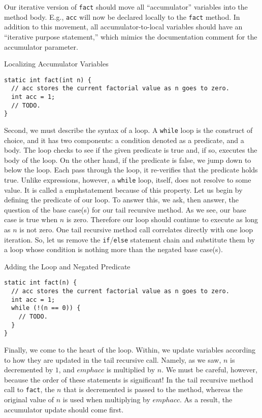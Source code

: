 Our iterative version of \texttt{fact} should move all ``accumulator'' variables into the method body. E.g., \texttt{acc} will now be declared locally to the \texttt{fact} method. In addition to this movement, all accumulator-to-local variables should have an ``iterative purpose statement,'' which mimics the documentation comment for the accumulator parameter.

\begin{cl}[]{Localizing Accumulator Variables}
\begin{lstlisting}[language=MyJava]
static int fact(int n) {
  // acc stores the current factorial value as n goes to zero.
  int acc = 1;
  // TODO.
}
\end{lstlisting}
\end{cl}

Second, we must describe the syntax of a loop. A \texttt{while} loop is the construct of choice, and it has two components: a condition denoted as a predicate, and a body. The loop checks to see if the given predicate is true and, if so, executes the body of the loop. On the other hand, if the predicate is false, we jump down to below the loop. Each pass through the loop, it re-verifies that the predicate holds true. Unlike expressions, however, a \texttt{while} loop, itself, does not resolve to some value. It is called a emph{statement} because of this property. Let us begin by defining the predicate of our loop. To answer this, we ask, then answer, the question of the base case(s) for our tail recursive method. As we see, our base case is true when $n$ is zero. Therefore our loop should continue to execute as long as $n$ is not zero. One tail recursive method call correlates directly with one loop iteration. So, let us remove the \texttt{if}/\texttt{else} statement chain and substitute them by a loop whose condition is nothing more than the negated base case(s).

\begin{cl}[]{Adding the Loop and Negated Predicate}
\begin{lstlisting}[language=MyJava]
static int fact(n) {
  // acc stores the current factorial value as n goes to zero.
  int acc = 1;
  while (!(n == 0)) {
    // TODO.
  }
}
\end{lstlisting}
\end{cl}

Finally, we come to the heart of the loop. Within, we update variables according to how they are updated in the tail recursive call. Namely, as we saw, $n$ is decremented by $1$, and $emph{acc}$ is multiplied by $n$. We must be careful, however, because the order of these statements is significant! In the tail recursive method call to \texttt{fact}, the $n$ that is decremented is passed to the method, whereas the original value of $n$ is used when multiplying by $emph{acc}$. As a result, the accumulator update should come first.

